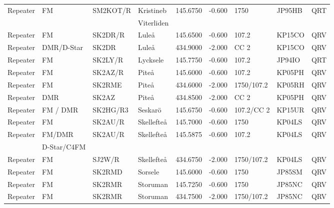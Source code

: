 \begin{landscape}
\begin{longtable}{llllrrlll}
Repeater   & FM          & SM2KOT/R  & Kristineb          & 145.6750     & -0.600     & 1750       & JP95HB      & QRT      \\
           &             &           & Viterliden         &              &            &            &             &          \\
Repeater   & FM          & SK2DR/R   & Luleå              & 145.6500     & -0.600     & 107.2      & KP15CO      & QRV      \\
Repeater   & DMR/D-Star  & SK2DR     & Luleå              & 434.9000     & -2.000     & CC 2       & KP15CO      & QRV      \\
Repeater   & FM          & SK2LY/R   & Lycksele           & 145.7750     & -0.600     & 107.2      & JP94IO      & QRT      \\
Repeater   & FM          & SK2AZ/R   & Piteå              & 145.6000     & -0.600     & 107.2      & KP05PH      & QRV      \\
Repeater   & FM          & SK2RME    & Piteå              & 434.6000     & -2.000     & 1750/107.2 & KP05RH      & QRV      \\
Repeater   & DMR         & SK2AZ     & Piteå              & 434.8500     & -2.000     & CC 2       & KP05PH      & QRV      \\
Repeater   & FM / DMR    & SK2HG/R3  & Seskarö            & 145.6750     & -0.600     & 107.2/CC 2 & KP15UR      & QRV      \\
Repeater   & FM          & SK2AU/R   & Skellefteå         & 145.7000     & -0.600     & 1750       & KP04LS      & QRV      \\
Repeater   & FM/DMR      & SK2AU/R   & Skellefteå         & 145.5875     & -0.600     & 107.2      & KP04LS      & QRV      \\
           & D-Star/C4FM &           &                    &              &            &            &             &          \\
Repeater   & FM          & SJ2W/R    & Skellefteå         & 434.6750     & -2.000     & 1750/107.2 & KP04LS      & QRV      \\
Repeater   & FM          & SK2RMD    & Sorsele            & 145.6000     & -0.600     & 1750       & JP85SM      & QRV      \\
Repeater   & FM          & SK2RMR    & Storuman           & 145.7250     & -0.600     & 1750       & JP85NC      & QRV      \\
Repeater   & FM          & SK2RMR    & Storuman           & 434.7500     & -2.000     & 1750/107.2 & JP85NC      & QRV      \\

\end{longtable}
\end{landscape}
